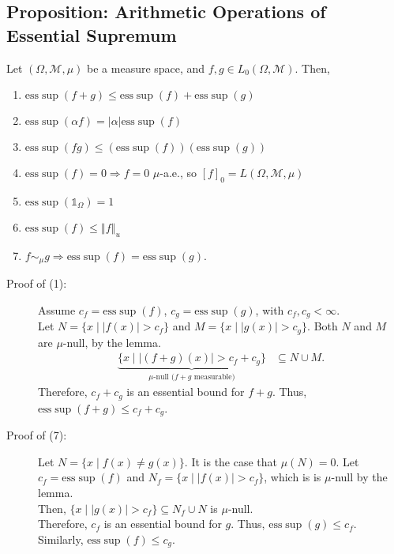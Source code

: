 \documentclass[9pt]{extarticle}
\newcommand{\norm}[1]{\left\Vert #1 \right\Vert}
\newcommand{\esssup}{\text{ess}\sup}
\begin{document}
  \subsection{Proposition: Arithmetic Operations of Essential Supremum}%
  Let $(\Omega,\mathcal{M},\mu)$ be a measure space, and $f,g\in L_{0}(\Omega,\mathcal{M})$. Then,
  \begin{enumerate}[(1)]
    \item $\esssup(f+g)\leq \esssup(f) + \esssup(g)$
    \item $\esssup(\alpha f) = |\alpha|\esssup(f)$
    \item $\esssup(fg)\leq \left(\esssup(f)\right)\left(\esssup(g)\right)$
    \item $\esssup(f) = 0 \Rightarrow f = 0$ $\mu$-a.e., so $[f]_0 = L(\Omega,\mathcal{M},\mu)$
    \item $\esssup(\mathbb{1}_{\Omega})=  1$
    \item $\esssup(f) \leq \norm{f}_{u}$
    \item $f\sim_{\mu}g \Rightarrow \esssup(f) = \esssup(g)$.
  \end{enumerate}
  \begin{description}
    \item[Proof of (1):] Assume $c_f = \esssup(f)$, $c_g = \esssup(g)$, with $c_f,c_g < \infty$.\\

      Let $N = \{x\mid |f(x)| > c_f\}$ and $M = \{x\mid |g(x)| > c_g\}$. Both $N$ and $M$ are $\mu$-null, by the lemma.
      \begin{align*}
        \underbrace{\{x\mid |(f+g)(x)| > c_f + c_g\}}_{\mu\text{-null ($f+g$ measurable)}} &\subseteq N\cup M.
      \end{align*}
      Therefore, $c_f + c_g$ is an essential bound for $f+g$. Thus, $\esssup(f+g) \leq c_f + c_g$.
    \item[Proof of (7):] Let $N = \{x\mid f(x) \neq g(x)\}$. It is the case that $\mu(N) = 0$. Let $c_f = \esssup(f)$ and $N_f = \{x\mid |f(x)| > c_f\}$, which is is $\mu$-null by the lemma.\\

      Then, $\{x\mid |g(x)| > c_f\}\subseteq N_f \cup N$ is $\mu$-null.\\

      Therefore, $c_f$ is an essential bound for $g$. Thus, $\esssup(g) \leq c_f$.\\

      Similarly, $\esssup(f) \leq c_g$.
  \end{description}
\end{document}
